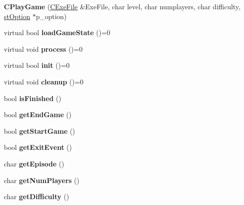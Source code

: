 \begin{DoxyCompactItemize}
\item 
\hypertarget{class_c_play_game_a1f1c29018a8ac5a9a2def9c1b1bf9d90}{
{\bfseries CPlayGame} (\hyperlink{class_c_exe_file}{CExeFile} \&ExeFile, char level, char numplayers, char difficulty, \hyperlink{structst_option}{stOption} $\ast$p\_\-option)}
\label{class_c_play_game_a1f1c29018a8ac5a9a2def9c1b1bf9d90}

\item 
\hypertarget{class_c_play_game_a9fa74295f4edc3a23016a17803f1a85f}{
virtual bool {\bfseries loadGameState} ()=0}
\label{class_c_play_game_a9fa74295f4edc3a23016a17803f1a85f}

\item 
\hypertarget{class_c_play_game_a6a8c425d3740c304cb434081ac5a25dc}{
virtual void {\bfseries process} ()=0}
\label{class_c_play_game_a6a8c425d3740c304cb434081ac5a25dc}

\item 
\hypertarget{class_c_play_game_a347324229b036265215fe4e8e8cba45d}{
virtual bool {\bfseries init} ()=0}
\label{class_c_play_game_a347324229b036265215fe4e8e8cba45d}

\item 
\hypertarget{class_c_play_game_a5804d7fa9f495227f6df68cc146bdeb3}{
virtual void {\bfseries cleanup} ()=0}
\label{class_c_play_game_a5804d7fa9f495227f6df68cc146bdeb3}

\item 
\hypertarget{class_c_play_game_a411b6a3fe11ed2d9b36b28415f2cd69f}{
bool {\bfseries isFinished} ()}
\label{class_c_play_game_a411b6a3fe11ed2d9b36b28415f2cd69f}

\item 
\hypertarget{class_c_play_game_a2a0e5174301a8d2cac27b9db757c8222}{
bool {\bfseries getEndGame} ()}
\label{class_c_play_game_a2a0e5174301a8d2cac27b9db757c8222}

\item 
\hypertarget{class_c_play_game_aa061193d44d3ae7ce27207227938df71}{
bool {\bfseries getStartGame} ()}
\label{class_c_play_game_aa061193d44d3ae7ce27207227938df71}

\item 
\hypertarget{class_c_play_game_adbab13480eab77f8b35202c5a91a544b}{
bool {\bfseries getExitEvent} ()}
\label{class_c_play_game_adbab13480eab77f8b35202c5a91a544b}

\item 
\hypertarget{class_c_play_game_a5588fd88f3cca59578997a56971bd5a2}{
char {\bfseries getEpisode} ()}
\label{class_c_play_game_a5588fd88f3cca59578997a56971bd5a2}

\item 
\hypertarget{class_c_play_game_a65a73f42cc82ff801ce88a2078619459}{
char {\bfseries getNumPlayers} ()}
\label{class_c_play_game_a65a73f42cc82ff801ce88a2078619459}

\item 
\hypertarget{class_c_play_game_a1ffeee9b3a6b9b6f3afaf1a239e2e544}{
char {\bfseries getDifficulty} ()}
\label{class_c_play_game_a1ffeee9b3a6b9b6f3afaf1a239e2e544}

\end{DoxyCompactItemize}
